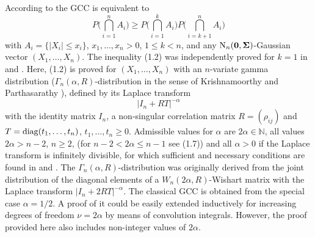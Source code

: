 \documentclass[12pt,twoside]{article}
\numberwithin{equation}{section}
\theoremstyle{plain}
\def\N{\mathbb{N}}
\def\Nor{{\rm N}}
\def\bSigma{{\boldsymbol\Sigma}}
\def\diag{{\rm{diag}}}
\def\bzero{\boldsymbol{0}}
\begin{document}
According to \cite{schechtman} the GCC is equivalent to
\begin{equation}
\label{1.2}
P\Big(\bigcap_{i=1}^n A_i\Big) \ge P\Big(\bigcap_{i=1}^k A_i\Big) P\Big(\bigcap_{i=k+1}^n A_i\Big)
\end{equation}
with $A_i = \{|X_i| \le x_i\}$, $x_1,\ldots,x_n > 0$, $1 \le k < n$, and any $\Nor_n(\bzero,\bSigma)$-Gaussian vector $(X_1,\ldots,X_n)$. The inequality (1.2) was independently proved for $k=1$ in \cite{khatri} and \cite{schechtman}. Here, (1.2) is proved for $(X_1,\ldots,X_n)$ with an $n$-variate gamma distribution ($\Gamma_n(\alpha,R)$-distribution in the sense of Krishnamoorthy and Parthasarathy \cite{krishna}), defined by its Laplace transform 
\begin{equation}
\label{1.3}
|I_n+RT|^{-\alpha}
\end{equation}
with the identity matrix $I_n$, a non-singular correlation matrix $R = (\rho_{ij})$ and $T = \diag(t_1,\ldots,t_n)$, $t_1,\ldots,t_n \ge 0$.  Admissible values for $\alpha$ are $2\alpha \in \N$, all values $2\alpha > n-2$, $n \ge 2$, (for $n-2 < 2\alpha \le n-1$ see (1.7)) and all $\alpha > 0$ if the Laplace transform is infinitely divisible, for which sufficient and necessary conditions are found in \cite{bapat} and \cite{griffiths}. The $\Gamma_n(\alpha,R)$-distribution was originally derived from the joint distribution of the diagonal elements of a $W_n(2\alpha,R)$-Wishart matrix with the Laplace transform $|I_n+2RT|^{-\alpha}$. The classical GCC is obtained from the special case $\alpha = 1/2$. A proof of it could be easily extended inductively for increasing degrees of freedom $\nu = 2\alpha$ by means of convolution integrals. However, the proof provided here also includes non-integer values of $2\alpha$.
\end{document}
